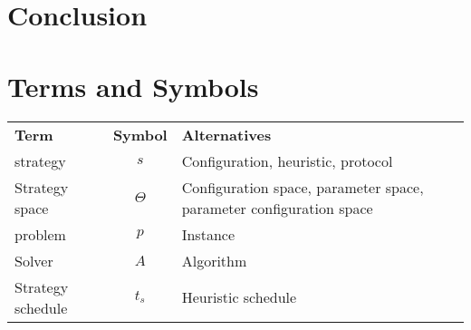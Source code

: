 \documentclass[twoside]{ctuthesis}
\begin{document}
\maketitle







\chapter{Conclusion}



\appendix



\chapter{Terms and Symbols}

\begin{tabularx}{\linewidth}
{ l c >{\raggedright\arraybackslash}X }
\bfseries Term & \bfseries Symbol & \bfseries Alternatives \\
\Midrule
\Gls{strategy} & $s$ & Configuration, heuristic, protocol \\
Strategy space & $\Theta$ & Configuration space, parameter space, parameter configuration space \\
\Gls{problem} & $p$ & Instance \\
Solver & $A$ & Algorithm \\
Strategy schedule & $t_s$ & Heuristic schedule \\
\end{tabularx}

\printglossaries




\end{document}
